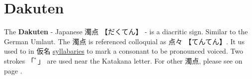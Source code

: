 \section{Dakuten} \label{sec:Dakuten}

The \textbf{Dakuten} - Japanese {濁点} {【だくてん】} - is a diacritic sign.
Similar to the German Umlaut.  The {濁点} is referenced colloquial as {点々}
{【てんてん】}.  It us used to in {仮名} \hyperref[sec:Syllable]{syllabaries}
to mark a consonant to be pronounced voiced. Two strokes {「ﾞ」} are used near
the Katakana letter.  For other {濁点}, please see  on
page \pageref{sec:Iteration}.

